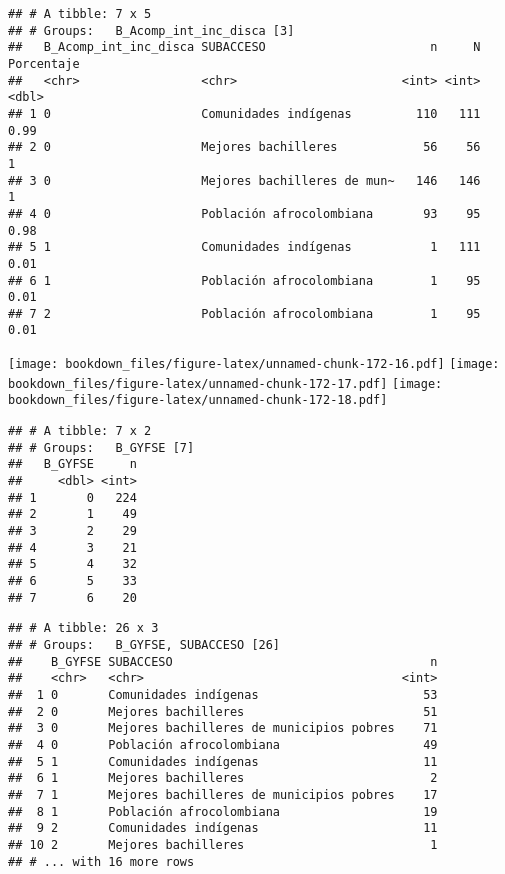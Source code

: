 \documentclass[]{article}
\theoremstyle{definition}
\theoremstyle{definition}
\theoremstyle{definition}
\theoremstyle{remark}
\begin{document}
\begin{verbatim}
## # A tibble: 7 x 5
## # Groups:   B_Acomp_int_inc_disca [3]
##   B_Acomp_int_inc_disca SUBACCESO                       n     N Porcentaje
##   <chr>                 <chr>                       <int> <int>      <dbl>
## 1 0                     Comunidades indígenas         110   111       0.99
## 2 0                     Mejores bachilleres            56    56       1   
## 3 0                     Mejores bachilleres de mun~   146   146       1   
## 4 0                     Población afrocolombiana       93    95       0.98
## 5 1                     Comunidades indígenas           1   111       0.01
## 6 1                     Población afrocolombiana        1    95       0.01
## 7 2                     Población afrocolombiana        1    95       0.01
\end{verbatim}

\texttt{[image: bookdown\_files/figure-latex/unnamed-chunk-172-16.pdf]}
\texttt{[image: bookdown\_files/figure-latex/unnamed-chunk-172-17.pdf]}
\texttt{[image: bookdown\_files/figure-latex/unnamed-chunk-172-18.pdf]}

\begin{verbatim}
## # A tibble: 7 x 2
## # Groups:   B_GYFSE [7]
##   B_GYFSE     n
##     <dbl> <int>
## 1       0   224
## 2       1    49
## 3       2    29
## 4       3    21
## 5       4    32
## 6       5    33
## 7       6    20
\end{verbatim}

\begin{verbatim}
## # A tibble: 26 x 3
## # Groups:   B_GYFSE, SUBACCESO [26]
##    B_GYFSE SUBACCESO                                    n
##    <chr>   <chr>                                    <int>
##  1 0       Comunidades indígenas                       53
##  2 0       Mejores bachilleres                         51
##  3 0       Mejores bachilleres de municipios pobres    71
##  4 0       Población afrocolombiana                    49
##  5 1       Comunidades indígenas                       11
##  6 1       Mejores bachilleres                          2
##  7 1       Mejores bachilleres de municipios pobres    17
##  8 1       Población afrocolombiana                    19
##  9 2       Comunidades indígenas                       11
## 10 2       Mejores bachilleres                          1
## # ... with 16 more rows
\end{verbatim}
\end{document}

